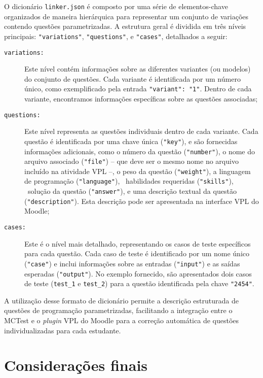 O dicionário \verb|linker.json| é composto por uma série de elementos-chave organizados de maneira hierárquica para representar um conjunto de variações contendo questões parametrizadas. A estrutura geral é dividida em três níveis principais: \verb|"variations"|, \verb|"questions"|, e \verb|"cases"|, detalhados a seguir:

\begin{description}
\item[\texttt{variations:}]  Este nível contém informações sobre as diferentes variantes (ou modelos) do conjunto de questões. Cada variante é identificada por um número único, como exemplificado pela entrada \verb|"variant": "1"|. Dentro de cada variante, encontramos informações específicas sobre as questões associadas;

\item[\texttt{questions:}] Este nível representa as questões individuais dentro de cada variante. Cada questão é identificada por uma chave única (\verb|"key"|), e são fornecidas informações adicionais, como o número da questão (\verb|"number"|), o nome do arquivo associado (\verb|"file"|) -- que deve ser o mesmo nome no arquivo incluído na atividade VPL --, o peso da questão (\verb|"weight"|), a linguagem de programação (\verb|"language"|), \ habilidades requeridas (\verb|"skills"|), \ solução da questão (\verb|"answer"|), e uma descrição textual da questão (\verb|"description"|). Esta descrição pode ser apresentada na interface VPL do Moodle;

\item[\texttt{cases:}] Este é o nível mais detalhado, representando os casos de teste específicos para cada questão. Cada caso de teste é identificado por um nome único (\verb|"case"|) e inclui informações sobre as entradas (\verb|"input"|) e as saídas esperadas (\verb|"output"|). No exemplo fornecido, são apresentados dois casos de teste (\verb|test_1| e \verb|test_2|) para a questão identificada pela chave \verb|"2454"|.
\end{description}

A utilização desse formato de dicionário permite a descrição estruturada de questões de programação parametrizadas, facilitando a integração entre o MCTest e o \textit{plugin} VPL do Moodle para a correção automática de questões individualizadas para cada estudante.

\section{Considerações finais}

